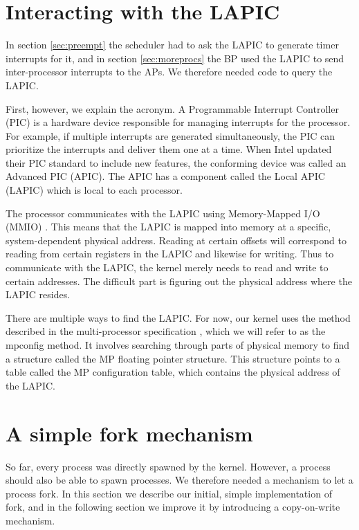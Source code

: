 \documentclass{report}
\begin{document}
\section{Interacting with the LAPIC}
\label{sec:mpconfig}
In section \ref{sec:preempt} the scheduler had to ask the LAPIC to generate
timer interrupts for it, and in section \ref{sec:moreprocs} the BP used the
LAPIC to send inter-processor interrupts to the APs. We therefore needed code
to query the LAPIC.

First, however, we explain the acronym. A Programmable Interrupt Controller
(PIC) is a hardware device responsible for managing interrupts for the
processor. For example, if multiple interrupts are generated simultaneously,
the PIC can prioritize the interrupts and deliver them one at a time. When
Intel updated their PIC standard to include new features, the conforming
device was called an Advanced PIC (APIC). The APIC has a component called the
Local APIC (LAPIC) which is local to each processor.

The processor communicates with the LAPIC using Memory-Mapped I/O (MMIO)
\cite{apic}. This means that the LAPIC is mapped into memory at a specific,
system-dependent physical address. Reading at certain offsets will correspond
to reading from certain registers in the LAPIC and likewise for writing. Thus
to communicate with the LAPIC, the kernel merely needs to read and write to
certain addresses. The difficult part is figuring out the physical address
where the LAPIC resides.

There are multiple ways to find the LAPIC. For now, our kernel uses the method
described in the multi-processor specification \cite{mpspec}, which we will
refer to as the mpconfig method. It involves searching through parts of
physical memory to find a structure called the MP floating pointer structure.
This structure points to a table called the MP configuration table, which
contains the physical address of the LAPIC. 



\section{A simple fork mechanism}
So far, every process was directly spawned by the kernel. However, a process
should also be able to spawn processes. We therefore needed a mechanism to let
a process fork. In this section we describe our initial, simple implementation
of fork, and in the following section we improve it by introducing a
copy-on-write mechanism.
\end{document}
